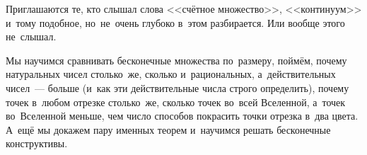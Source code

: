



Приглашаются те, кто слышал слова <<счётное множество>>, <<континуум>> и~тому
подобное, но~не~очень глубоко в~этом разбирается.
Или вообще этого не~слышал.

Мы научимся сравнивать бесконечные множества по~размеру, поймём, почему
натуральных чисел столько~же, сколько и~рациональных, а~действительных
чисел~--- больше (и~как эти действительные числа строго определить), почему
точек в~любом отрезке столько~же, сколько точек во~всей Вселенной, а~точек
во~Вселенной меньше, чем число способов покрасить точки отрезка в~два цвета.
А~ещё мы докажем пару именных теорем и~научимся решать бесконечные
конструктивы.
